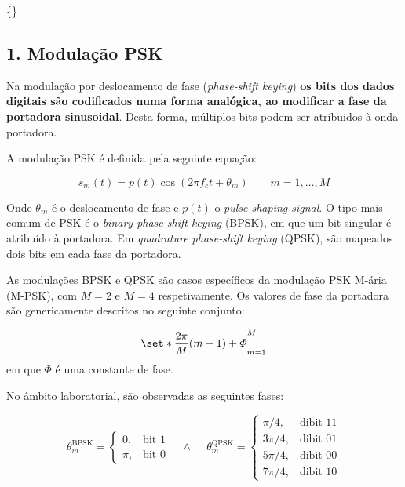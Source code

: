 %
\DeclarePairedDelimiter\set\{\}
\subsection{1. Modulaç\~ao PSK}
\label{subsec:intro}
Na modulação por deslocamento de fase (\textit{phase-shift keying}) \textbf{os bits dos dados digitais são codificados numa forma analógica, ao modificar a fase da portadora sinusoidal}. Desta forma, múltiplos bits podem ser atríbuidos à onda portadora. 

A modulação PSK é definida pela seguinte equação:

\[ 
    s_m(t) = p(t)\cos{(2\pi f_c t + \theta_m)}\qquad m=1,\hdots,M
\]

Onde $\theta_m$ é o deslocamento de fase e $p(t)$ o \textit{pulse shaping signal}. O tipo mais comum de PSK é o \textit{binary phase-shift keying} (BPSK), em que um bit singular é atribuído à portadora. Em \textit{quadrature phase-shift keying} (QPSK), são mapeados dois bits em cada fase da portadora.

As modulações BPSK e QPSK são casos específicos da modulação PSK M-ária (M-PSK), com $M=2$ e $M=4$ respetivamente\footnotemark[1]. Os valores de fase da portadora são genericamente descritos no seguinte conjunto:


$$
    \set*{\frac{2\pi}{M}(m-1) + \varPhi}_{m=1}^{M}
$$
em que $\varPhi$ é uma constante de fase\footnotemark[2]. 

No âmbito laboratorial, são observadas as seguintes fases:


$$
    \theta_m^{\text{BPSK}}= 
    \begin{cases}
        0\text{,}\ & \text{bit 1}\\
        \pi\text{,}\ & \text{bit 0}
    \end{cases}
    \quad \land \quad\
    \theta_m^{\text{QPSK}}= 
    \begin{cases}
        \pi/4\text{,}\ & \text{dibit 11}\\
        3 \pi/4\text{,}\ & \text{dibit 01}\\
        5 \pi/4\text{,}\ & \text{dibit 00}\\
        7 \pi/4\text{,}\ & \text{dibit 10}
    \end{cases}
$$

